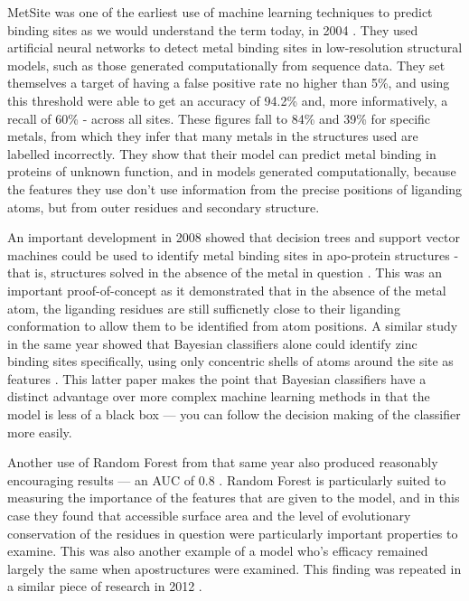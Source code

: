 MetSite was one of the earliest use of machine learning techniques to predict binding sites as we would understand the term today, in 2004 \cite{sodhi2004predicting}. They used artificial neural networks to detect metal binding sites in low-resolution structural models, such as those generated computationally from sequence data. They set themselves a target of having a false positive rate no higher than 5\%, and using this threshold were able to get an  accuracy of 94.2\% and, more informatively, a recall of 60\% - across all sites. These figures fall to 84\% and 39\% for specific metals, from which they infer that many metals in the structures used are labelled incorrectly. They show that their model can predict metal binding in proteins of unknown function, and in models generated computationally, because the features they use don't use information from the precise positions of liganding atoms, but from outer residues and secondary structure.

An important development in 2008 showed that decision trees and support vector machines could be used to identify metal binding sites in apo-protein structures - that is, structures solved in the absence of the metal in question \cite{babor2008}. This was an important proof-of-concept as it demonstrated that in the absence of the metal atom, the liganding residues are still sufficnetly close to their liganding conformation to allow them to be identified from atom positions. A similar study in the same year showed that Bayesian classifiers alone could identify zinc binding sites specifically, using only concentric shells of atoms around the site as features \cite{ebert2008}. This latter paper makes the point that Bayesian classifiers have a distinct advantage over more complex machine learning methods in that the model is less of a black box --- you can follow the decision making of the classifier more easily.

Another use of Random Forest from that same year also produced reasonably encouraging results --- an AUC of 0.8 \cite{bordner2008}. Random Forest is particularly suited to measuring the importance of the features that are given to the model, and in this case they found that accessible surface area and the level of evolutionary conservation of the residues in question were particularly important properties to examine. This was also another example of a model who's efficacy remained largely the same when apostructures were examined. This finding was repeated in a similar piece of research in 2012 \cite{zheng2012}.

